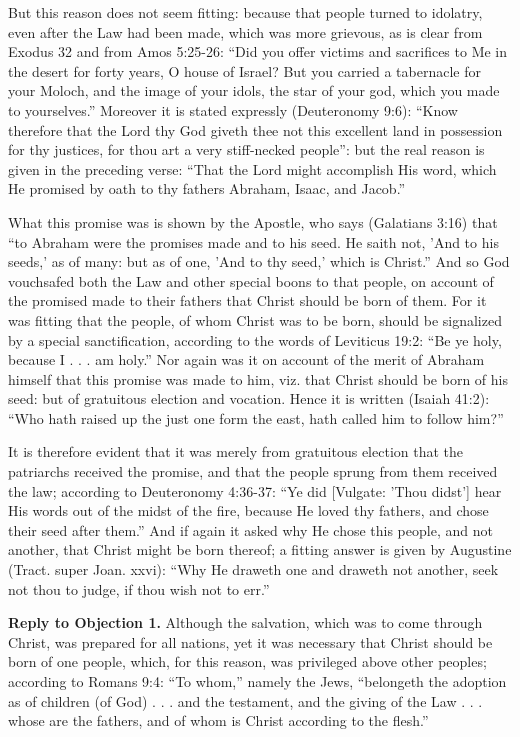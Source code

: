 But this reason does not seem fitting: because that people turned to idolatry, even after the Law had been made, which was more grievous, as is clear from Exodus 32 and from Amos 5:25-26: ``Did you offer victims and sacrifices to Me in the desert for forty years, O house of Israel? But you carried a tabernacle for your Moloch, and the image of your idols, the star of your god, which you made to yourselves.'' Moreover it is stated expressly (Deuteronomy 9:6): ``Know therefore that the Lord thy God giveth thee not this excellent land in possession for thy justices, for thou art a very stiff-necked people'': but the real reason is given in the preceding verse: ``That the Lord might accomplish His word, which He promised by oath to thy fathers Abraham, Isaac, and Jacob.''

What this promise was is shown by the Apostle, who says (Galatians 3:16) that ``to Abraham were the promises made and to his seed. He saith not, 'And to his seeds,' as of many: but as of one, 'And to thy seed,' which is Christ.'' And so God vouchsafed both the Law and other special boons to that people, on account of the promised made to their fathers that Christ should be born of them. For it was fitting that the people, of whom Christ was to be born, should be signalized by a special sanctification, according to the words of Leviticus 19:2: ``Be ye holy, because I . . . am holy.'' Nor again was it on account of the merit of Abraham himself that this promise was made to him, viz. that Christ should be born of his seed: but of gratuitous election and vocation. Hence it is written (Isaiah 41:2): ``Who hath raised up the just one form the east, hath called him to follow him?''

It is therefore evident that it was merely from gratuitous election that the patriarchs received the promise, and that the people sprung from them received the law; according to Deuteronomy 4:36-37: ``Ye did [Vulgate: 'Thou didst'] hear His words out of the midst of the fire, because He loved thy fathers, and chose their seed after them.'' And if again it asked why He chose this people, and not another, that Christ might be born thereof; a fitting answer is given by Augustine (Tract. super Joan. xxvi): ``Why He draweth one and draweth not another, seek not thou to judge, if thou wish not to err.''

\textbf{Reply to Objection 1.} Although the salvation, which was to come through Christ, was prepared for all nations, yet it was necessary that Christ should be born of one people, which, for this reason, was privileged above other peoples; according to Romans 9:4: ``To whom,'' namely the Jews, ``belongeth the adoption as of children (of God) . . . and the testament, and the giving of the Law . . . whose are the fathers, and of whom is Christ according to the flesh.''

